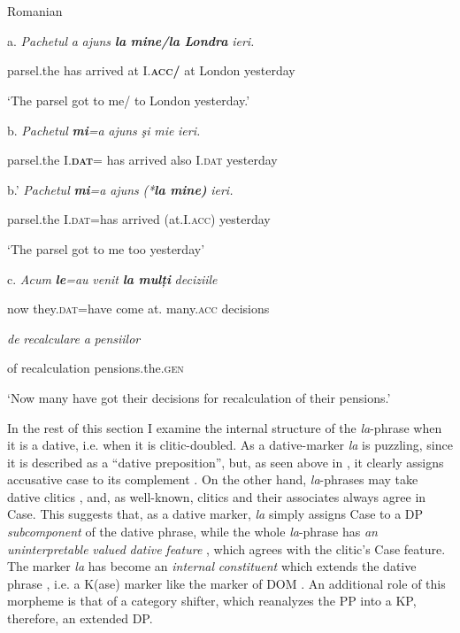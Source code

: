 \documentclass[output=paper,colorlinks,citecolor=brown]{./langscibook}
\begin{document}
\ea%
    \label{ex:key:11}
    \gll\\
        \\
    \glt
    \z

          Romanian

  a.  \textit{Pachetul}   \textit{a} \textit{ajuns}    \textbf{\textit{la} \textit{mine/la} \textit{Londra}}  \textit{ieri.}

    parsel.the  has arrived   at I.\textbf{\textsc{acc}}\textbf{/} at London  yesterday

    ‘The parsel got to me/ to London yesterday.’

  b.  \textit{Pachetul}  \textbf{\textit{mi}}\textit{=a}    \textit{ajuns}  \textit{şi}     \textit{mie}  \textit{ieri.}

    parsel.the  I.\textbf{\textsc{dat}}= has   arrived   also I.\textsc{dat}  yesterday

  b.’  \textit{Pachetul}  \textbf{\textit{mi}}\textit{=a}     \textit{ajuns}  \textit{(*}\textbf{\textit{la} \textit{mine)}}  \textit{ieri.}

    parsel.the  I.\textsc{dat}=has  arrived  (at.I.\textsc{acc})  yesterday

    ‘The parsel  got to me too yesterday’

  c.  \textit{Acum}   \textbf{\textit{le}}\textit{=au}   \textit{venit}     \textbf{\textit{la} \textit{mulți}}    \textit{deciziile}  

now  they.\textsc{dat}=have come  at. many.\textsc{acc}  decisions 

\textit{de}  \textit{recalculare}    \textit{a} \textit{pensiilor}

of  recalculation  pensions.the.\textsc{gen}

‘Now many have got their decisions for recalculation of their pensions.’

In the rest of this section I examine the internal structure of the \textit{la}{}-phrase when it is a dative, i.e. when it is clitic-doubled. As a dative-marker \textit{la} is puzzling, since it is described as a “dative preposition”, but, as seen above in , it clearly assigns accusative case to its complement . On the other hand, \textit{la}{}-phrases may take dative clitics , and, as well-known, clitics and their associates always agree in Case. This suggests that, as a dative marker, \textit{la} simply assigns Case to a DP \textit{subcomponent} of the dative phrase, while the whole \textit{la}{}-phrase has \textit{an} \textit{uninterpretable} \textit{valued} \textit{dative} \textit{feature} , which agrees with the clitic’s Case feature. The marker \textit{la} has become an \textit{internal} \textit{constituent} which extends the dative phrase , i.e. a K(ase) marker like the marker of DOM \citep{López2012}. An additional role of this morpheme is that of a category shifter, which reanalyzes the PP into a KP, therefore, an extended DP.
\end{document}
